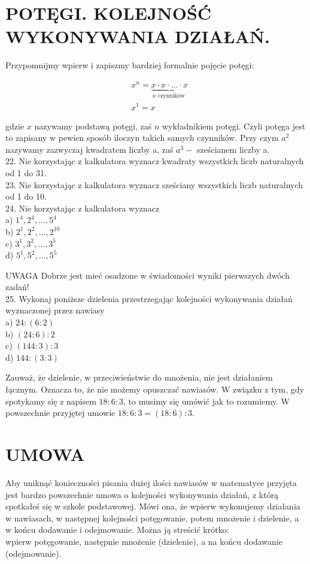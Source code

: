 \documentclass[10pt]{article}
\begin{document}
\section*{POTĘGI. KOLEJNOŚĆ WYKONYWANIA DZIAŁAŃ.}
Przypomnijmy wpierw i zapiszmy bardziej formalnie pojęcie potęgi:

\[
\begin{aligned}
& x^{n}=\underbrace{x \cdot x \cdot \ldots \cdot x}_{n \text { czynników }} \\
& x^{1}=x
\end{aligned}
\]

gdzie \(x\) nazywamy podstawą potęgi, zaś \(n\) wykładnikiem potęgi. Czyli potęga jest to zapisany w pewien sposób iloczyn takich samych czynników. Przy czym \(a^{2}\) nazywamy zazwyczaj kwadratem liczby a, zaś \(a^{3}-\) sześcianem liczby a.\\
22. Nie korzystając z kalkulatora wyznacz kwadraty wszystkich liczb naturalnych od 1 do 31.\\
23. Nie korzystając z kalkulatora wyznacz sześciany wszystkich liczb naturalnych od 1 do 10.\\
24. Nie korzystając z kalkulatora wyznacz\\
a) \(1^{4}, 2^{4}, \ldots, 5^{4}\)\\
b) \(2^{1}, 2^{2}, \ldots, 2^{10}\)\\
c) \(3^{1}, 3^{2}, \ldots, 3^{5}\)\\
d) \(5^{1}, 5^{2}, \ldots, 5^{5}\)

UWAGA Dobrze jest mieć osadzone w świadomości wyniki pierwszych dwóch zadań!\\
25. Wykonaj poniższe dzielenia przestrzegając kolejności wykonywania działań wyznaczonej przez nawiasy\\
a) \(24:(6: 2)\)\\
b) \((24: 6): 2\)\\
c) \((144: 3): 3\)\\
d) \(144:(3: 3)\)

Zauważ, że dzielenie, w przeciwieństwie do mnożenia, nie jest działaniem łącznym. Oznacza to, że nie możemy opuszczać nawiasów. W związku z tym, gdy spotykamy się z napisem \(18: 6: 3\), to musimy się umówić jak to rozumiemy. W powszechnie przyjętej umowie \(18: 6: 3=(18: 6): 3\).

\section*{UMOWA}
Aby uniknąć konieczności pisania dużej ilości nawiasów w matematyce przyjęta jest bardzo powszechnie umowa o kolejności wykonywania działań, z którą spotkałeś się w szkole podstawowej. Mówi ona, że wpierw wykonujemy działania w nawiasach, w następnej kolejności potęgowanie, potem mnożenie i dzielenie, a w końcu dodawanie i odejmowanie. Można ją streścić krótko:\\
wpierw potęgowanie, następnie mnożenie (dzielenie), a na końcu dodawanie (odejmowanie).
\end{document}

